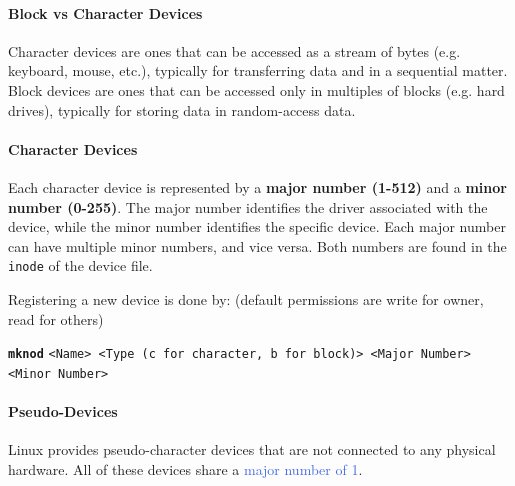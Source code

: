 \documentclass[openany,12pt]{book}
\newcommand{\code}[1]{\texttt{#1}}
\newcommand{\blue}[1]{\textcolor{RoyalBlue}{#1}}
\begin{document}
\paragraph{Block vs Character Devices} Character devices are ones that can be accessed as a stream of bytes (e.g. keyboard, mouse, etc.), typically for transferring data and in a sequential matter. Block devices are ones that can be accessed only in multiples of blocks (e.g. hard drives), typically for storing data in random-access data.

\paragraph{Character Devices} Each character device is represented by a \textbf{major number (1-512)} and a \textbf{minor number (0-255)}. The major number identifies the driver associated with the device, while the minor number identifies the specific device. Each major number can have multiple minor numbers, and vice versa. Both numbers are found in the \code{inode} of the device file.

\vspace*{1em}
Registering a new device is done by: (default permissions are write for owner, read for others)
\begin{center}
  \textbf{\code{mknod}} \code{<Name> <Type (c for character, b for block)> <Major Number> <Minor Number>}
\end{center}


\paragraph{Pseudo-Devices} Linux provides pseudo-character devices that are not connected to any physical hardware. All of these devices share a \blue{major number of 1}.
\end{document}
